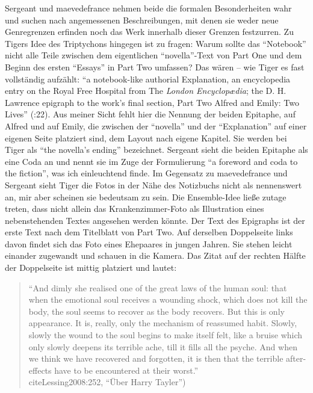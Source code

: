 \documentclass[fontsize=12pt]{scrartcl}
\begin{document}
Sergeant und maevedefrance nehmen beide die formalen Besonderhei\-ten wahr und suchen nach angemessenen Beschreibungen, mit denen sie weder neue Genregrenzen erfinden noch das Werk innerhalb dieser Grenzen festzurren. Zu Tigers Idee des Triptychons hingegen ist zu fragen: Warum sollte das "`Notebook"' nicht alle Teile zwischen dem eigentlichen "`novella"'-Text von Part One und dem Beginn des ersten "`Essays"' in Part Two umfassen? Das w\"aren -- wie Tiger es fast vollst\"andig aufz\"ahlt: "`a notebook-like authorial Explanation, an encyclopedia entry on the Royal Free Hospital from The \textit{London Encyclop{\ae}dia}; the D. H. Lawrence epigraph to the work's final section, Part Two Alfred and Emily: Two Lives"' (\cite{Tiger2009}:22). Aus meiner Sicht fehlt \mbox{hier} die Nennung der beiden Epitaphe, auf Alfred und auf Emily, die zwischen der "`novella"' und der "`Explanation"' auf einer eigenen Seite platziert sind, dem Layout nach eigene Kapitel. Sie werden bei Tiger als "`the novella's ending"' be\-zeichnet. Sergeant sieht die beiden Epitaphe als eine Coda an und \mbox{nennt} sie im Zuge der Formulierung "`a foreword and coda to the fiction"', was ich einleuchtend finde. Im Gegensatz zu maevedefrance und Sergeant sieht Tiger die Fotos in der N\"ahe des Notizbuchs nicht als nennenswert an, mir aber scheinen sie bedeutsam zu sein. Die Ensemble-Idee lie{\ss}e zutage treten, dass nicht allein das Krankenzimmer-Foto als Illustration eines nebenstehenden Textes angesehen werden k\"onnte. Der Text des Epigraphs ist der erste Text nach dem Titelblatt von Part Two. Auf derselben Doppelseite links davon findet sich das Foto eines Ehepaares in jungen Jahren. Sie stehen leicht einander zugewandt und schauen in die Kamera. Das Zitat auf der rechten H\"alfte der Doppelseite ist mittig platziert und lautet:

\singlespacing
\begin{quote}
"`And dimly she realised one of the great laws of the human soul: that when the emotional soul receives a wounding shock, which does not kill the body, the soul seems to recover as the body recovers. But this is only appearance. It is, really, only the mechanism of reassumed habit. Slowly, slowly the wound to the soul begins to make itself felt, like a bruise which only slowly deepens its terrible ache, till it fills all the psyche. And when we think we have recovered and forgotten, it is then that the terrible after-effects have to be encountered at their worst."'\\cite{Lessing2008}:252, "`\"Uber Harry Tayler"')
\end{quote}
\onehalfspacing
\end{document}
